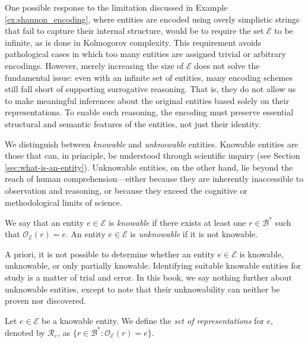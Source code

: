 One possible response to the limitation discussed in Example \ref{ex:shannon_encoding}, where entities are encoded using overly simplistic strings that fail to capture their internal structure, would be to require the set $\mathcal{E}$ to be infinite, as is done in Kolmogorov complexity. This requirement avoids pathological cases in which too many entities are assigned trivial or arbitrary encodings. However, merely increasing the size of $\mathcal{E}$ does not solve the fundamental issue: even with an infinite set of entities, many encoding schemes still fall short of supporting surrogative reasoning. That is, they do not allow us to make meaningful inferences about the original entities based solely on their representations. To enable such reasoning, the encoding must preserve essential structural and semantic features of the entities, not just their identity.

We distinguish between \emph{knowable} and \emph{unknowable} entities. Knowable entities are those that can, in principle, be understood through scientific inquiry (see Section \ref{sec:what-is-an-entity}). Unknowable entities, on the other hand, lie beyond the reach of human comprehension—either because they are inherently inaccessible to observation and reasoning, or because they exceed the cognitive or methodological limits of science.

\begin{definition}
We say that an entity $e \in \mathcal{E}$ is \emph{knowable} if there exists at least one $r \in \mathcal{B}^\ast$ such that $\mathcal{O}_\mathcal{E}(r) = e$. An entity $e \in \mathcal{E}$ is \emph{unknowable} if it is not knowable.
\end{definition}

A priori, it is not possible to determine whether an entity $e \in \mathcal{E}$ is knowable, unknowable, or only partially knowable. Identifying suitable knowable entities for study is a matter of trial and error. In this book, we say nothing further about unknowable entities, except to note that their unknowability can neither be proven nor discovered.

\begin{definition}
Let $e \in \mathcal{E}$ be a knowable entity. We define the \emph{set of representations} for $e$, denoted by $\mathcal{R}_e$, as $\{ r \in \mathcal{B}^\ast : \mathcal{O}_\mathcal{E} (r) = e \}$.
\end{definition}

